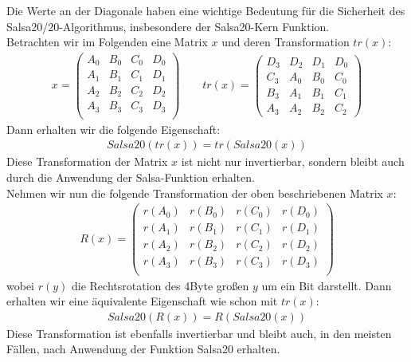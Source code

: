 \documentclass[course=erap]{aspdoc}
\begin{document}
Die Werte an der Diagonale haben eine wichtige Bedeutung für die Sicherheit des Salsa20/20-Algorithmus, insbesondere der Salsa20-Kern Funktion.
\vspace{1mm}
\\Betrachten wir im Folgenden eine Matrix $x$ und deren Transformation $tr(x)$:
\begin{gather*}
    x =
    \begin{pmatrix}
        A_0 & B_0 & C_0 & D_0 \\
        A_1 & B_1 & C_1 & D_1 \\
        A_2 & B_2 & C_2 & D_2 \\
        A_3 & B_3 & C_3 & D_3 \\
    \end{pmatrix}
    \quad \quad tr(x) =
    \begin{pmatrix}
        D_3 & D_2 & D_1 & D_0 \\
        C_3 & A_0 & B_0 & C_0 \\
        B_3 & A_1 & B_1 & C_1 \\
        A_3 & A_2 & B_2 & C_2
    \end{pmatrix}
\end{gather*}
Dann erhalten wir die folgende Eigenschaft:
\begin{gather*}
    Salsa20( tr(x) ) = tr( Salsa20(x) )
\end{gather*}
Diese Transformation der Matrix $x$ ist nicht nur invertierbar, sondern bleibt auch durch die Anwendung der Salsa-Funktion erhalten.\cite{salsa20security}
\\Nehmen wir nun die folgende Transformation der oben beschriebenen Matrix $x$:
\begin{gather*}
    R(x) =
    \begin{pmatrix}
        r(A_0) & r(B_0) & r(C_0) & r(D_0) \\
        r(A_1) & r(B_1) & r(C_1) & r(D_1) \\
        r(A_2) & r(B_2) & r(C_2) & r(D_2) \\
        r(A_3) & r(B_3) & r(C_3) & r(D_3) \\
    \end{pmatrix}
\end{gather*}
wobei $r(y)$ die Rechtsrotation des 4Byte großen $y$ um ein Bit darstellt. Dann erhalten wir eine äquivalente Eigenschaft wie schon mit $tr(x)$:
\begin{gather*}
    Salsa20(R(x)) = R(Salsa20(x))
\end{gather*}
Diese Transformation ist ebenfalls invertierbar und bleibt auch, in den meisten Fällen, nach Anwendung der Funktion Salsa20 erhalten.\cite{salsa20security}
\end{document}
